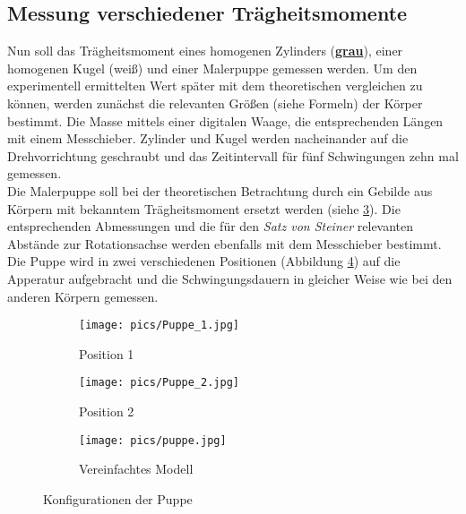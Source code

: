 \subsection{Messung verschiedener Trägheitsmomente}
Nun soll das Trägheitsmoment eines homogenen Zylinders (\textbf{\underline{grau}}), einer homogenen Kugel (weiß) und einer
Malerpuppe gemessen werden. Um den experimentell ermittelten Wert später mit dem theoretischen
vergleichen zu können, werden zunächst die relevanten Größen (siehe Formeln) der Körper
bestimmt. Die Masse mittels einer digitalen Waage, die entsprechenden Längen mit einem
Messchieber. Zylinder und Kugel werden nacheinander auf die Drehvorrichtung geschraubt und
das Zeitintervall für fünf Schwingungen zehn mal gemessen. \\
Die Malerpuppe soll bei der theoretischen Betrachtung durch ein Gebilde aus Körpern mit
bekanntem Trägheitsmoment ersetzt werden (siehe \ref{fig:pupmod}). Die entsprechenden Abmessungen und die für den \textit{Satz
von Steiner} relevanten Abstände zur Rotationsachse werden ebenfalls mit dem Messchieber bestimmt.
Die Puppe wird in zwei verschiedenen Positionen (Abbildung \ref{fig:konfig}) auf die Apperatur aufgebracht
und die Schwingungsdauern in gleicher Weise wie bei den anderen Körpern gemessen. \\

\begin{figure}
\centering
\begin{subfigure}{0.30\textwidth}
\centering
\texttt{[image: pics/Puppe\_1.jpg]}
\caption{Position 1}
\label{fig:pup1}
\end{subfigure}
\begin{subfigure}{0.30\textwidth}
\centering
\texttt{[image: pics/Puppe\_2.jpg]}
\caption{Position 2}
\label{fig:pup2}
\end{subfigure}
\begin{subfigure}{0.30\textwidth}
\centering
\texttt{[image: pics/puppe.jpg]}
\caption{Vereinfachtes Modell}
\label{fig:pupmod}
\end{subfigure}
\caption{Konfigurationen der Puppe}
\label{fig:konfig}
\end{figure}
